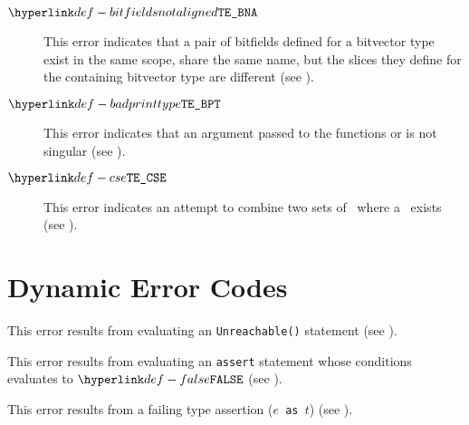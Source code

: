 \begin{description}
\hypertarget{def-bitfieldsnotaligned}{}
\item[$\BitfieldsNotAligned$]
This error indicates that a pair of bitfields defined for a bitvector type exist in the same
scope, share the same name, but the slices they define for the containing bitvector type are
different
(see ).

\item[$\BadPrintType$]%
\hypertarget{def-badprinttype}{}
  This error indicates that an argument passed to the functions \Tprint{} or
  \Tprintln{} is not singular (see ).
\hypertarget{def-cse}{}
\item[$\ConflictingSideEffects$]
This error indicates an attempt to combine two sets of \sideeffectdescriptorsterm\ where
a \sideeffectconflictterm\ exists
(see ).

\end{description}

\section{Dynamic Error Codes}
\begin{description}
\hypertarget{def-unr}{}
\item[$\UnreachableError$]
This error results from evaluating an \texttt{Unreachable()} statement (see ).

\hypertarget{def-daf}{}
\item[$\DynamicAssertionFailure$]
This error results from evaluating an \texttt{assert} statement whose
conditions evaluates to $\False$ (see ).

\hypertarget{def-datc}{}
\item[$\DynamicTypeAssertionFailure$]
This error results from a failing type assertion (\texttt{$e$ as $t$})
(see ).

\end{description}
